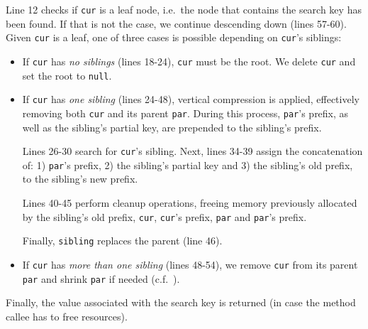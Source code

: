 \documentclass[abstracton,12pt]{scrartcl}
\theoremstyle{definition}
\begin{document}
Line 12 checks if \texttt{cur} is a leaf node, i.e.\ the node that contains 
the search key has been found. If that is not the case, we
continue descending down (lines 57-60). Given \texttt{cur} is a leaf, one
of three cases is possible depending on \texttt{cur}'s siblings:

\begin{itemize}
  \item If \texttt{cur} has \textit{no siblings} (lines 18-24), \texttt{cur}
    must be the root. We delete \texttt{cur} and set the root to \texttt{null}.

  \item If \texttt{cur} has \textit{one sibling} (lines 24-48), vertical
    compression is applied, effectively removing both \texttt{cur} and its
    parent \texttt{par}. During this process, \texttt{par}'s prefix,
    as well as the sibling's partial key, are prepended to the sibling's
    prefix.

    Lines 26-30 search for \texttt{cur}'s sibling. Next, lines 34-39 assign 
    the concatenation of: 1) \texttt{par}'s prefix, 2) the sibling's 
    partial key and 3) the sibling's old prefix, to the sibling's new prefix.

    Lines 40-45 perform cleanup operations, freeing memory previously allocated
    by the sibling's old prefix, \texttt{cur}, \texttt{cur}'s prefix,
    \texttt{par} and \texttt{par}'s prefix. 
    
    Finally, \texttt{sibling} replaces the parent (line 46).

  \item If \texttt{cur} has \textit{more than one sibling} (lines 48-54),
    we remove \texttt{cur} from its parent \texttt{par} and shrink
    \texttt{par} if needed (c.f.\ ).
\end{itemize}

Finally, the value associated with the search key is returned (in case the
method callee has to free resources).
\end{document}
